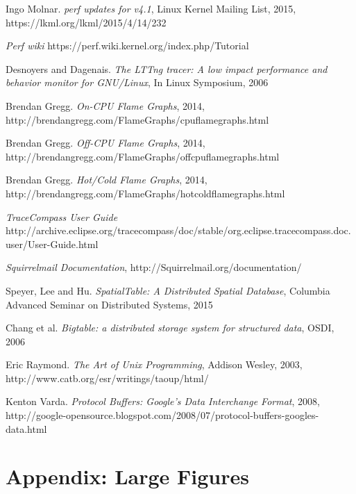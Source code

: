 \documentclass[10pt]{article}
\begin{document}
\raggedright
\begin{thebibliography}{9}

  Ingo Molnar.
  \emph{perf updates for v4.1},
  Linux Kernel Mailing List,
  2015,
  https://lkml.org/lkml/2015/4/14/232

  \emph{Perf wiki}
  https://perf.wiki.kernel.org/index.php/Tutorial
  
  Desnoyers and Dagenais.
  \emph{The LTTng tracer: A low impact performance and behavior monitor for
  GNU/Linux},
   In Linux Symposium,
   2006

  Brendan Gregg.
  \emph{On-CPU Flame Graphs},
   2014,
   http://brendangregg.com/FlameGraphs/cpuflamegraphs.html 
   
  Brendan Gregg.
  \emph{Off-CPU Flame Graphs},
   2014,
   http://brendangregg.com/FlameGraphs/offcpuflamegraphs.html
   
  Brendan Gregg.
  \emph{Hot/Cold Flame Graphs},
   2014,
   http://brendangregg.com/FlameGraphs/hotcoldflamegraphs.html
   
  \emph{TraceCompass User Guide}
  http://archive.eclipse.org/tracecompass/doc/stable/org.eclipse.tracecompass.doc.user/User-Guide.html

  \emph{Squirrelmail Documentation},
  http://Squirrelmail.org/documentation/

  Speyer, Lee and Hu.
  \emph{SpatialTable: A Distributed Spatial Database},
  Columbia Advanced Seminar on Distributed Systems,
  2015

  Chang et al.
  \emph{Bigtable: a distributed storage system for structured data},
  OSDI,
  2006

  Eric Raymond.
  \emph{The Art of Unix Programming},
  Addison Wesley,
  2003,
  http://www.catb.org/esr/writings/taoup/html/

  Kenton Varda.
  \emph{Protocol Buffers: Google's Data Interchange Format},
  2008,
  http://google-opensource.blogspot.com/2008/07/protocol-buffers-googles-data.html
\end{thebibliography}

\newpage

\section{Appendix: Large Figures}
\end{document}
